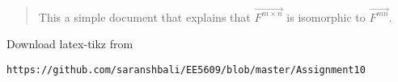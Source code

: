 \documentclass[journal,12pt,twocolumn]{IEEEtran}
\begin{document}
% 
\maketitle
\newpage
\bigskip
\renewcommand{\thefigure}{\theenumi}
\renewcommand{\thetable}{\theenumi}
%
%
\begin{abstract}
This a simple document that explains that $\vec{F^{m\times n}}$ is isomorphic to $\vec{F^{mn}}$.
\end{abstract}
Download latex-tikz from
\begin{lstlisting}
https://github.com/saranshbali/EE5609/blob/master/Assignment10
\end{lstlisting}
%
\end{document}
